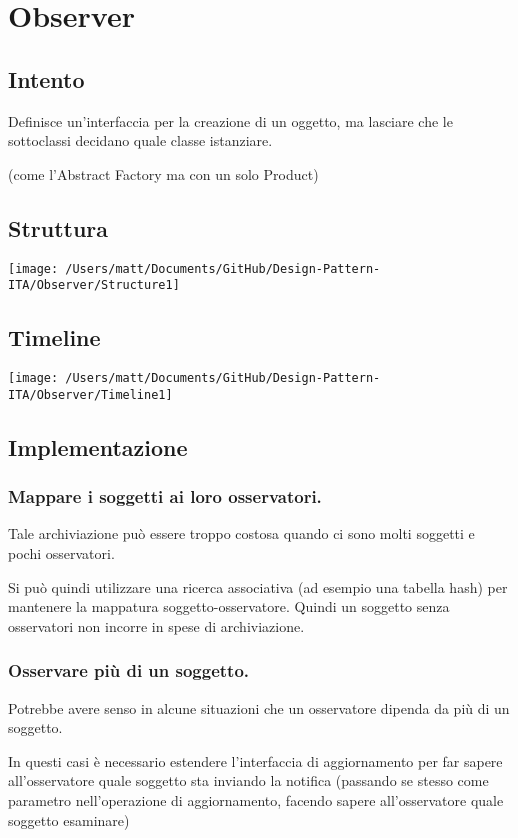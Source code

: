 \chapter{Observer}
\section{Intento}

Definisce un'interfaccia per la creazione di un oggetto, ma lasciare che le sottoclassi decidano quale classe istanziare.

(come l'Abstract Factory ma con un solo Product)


\section{Struttura}

\texttt{[image: /Users/matt/Documents/GitHub/Design-Pattern-ITA/Observer/Structure1]}


\section{Timeline}

\texttt{[image: /Users/matt/Documents/GitHub/Design-Pattern-ITA/Observer/Timeline1]}


\section{Implementazione}

\subsection{Mappare i soggetti ai loro osservatori.}
Tale archiviazione può essere troppo costosa quando ci sono molti soggetti e pochi osservatori.

Si può quindi utilizzare una ricerca associativa (ad esempio una tabella hash) per mantenere la mappatura soggetto-osservatore. Quindi un soggetto senza osservatori non incorre in spese di archiviazione.

\subsection{Osservare più di un soggetto.}
Potrebbe avere senso in alcune situazioni che un osservatore dipenda da più di un soggetto. 

In questi casi è necessario estendere l'interfaccia di aggiornamento per far sapere all'osservatore quale soggetto sta inviando la notifica (passando se stesso come parametro nell'operazione di aggiornamento, facendo sapere all'osservatore quale soggetto esaminare)

